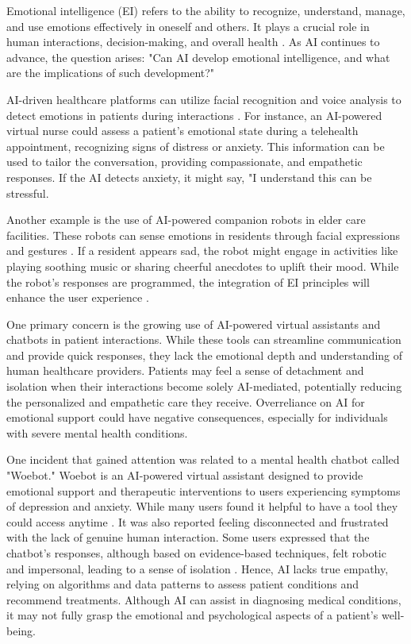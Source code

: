 \documentclass{article}
\begin{document}
Emotional intelligence (EI) refers to the ability to recognize, understand, manage, and use emotions effectively in oneself and others. It plays a crucial role in human interactions, decision-making, and overall health \cite{dixit2021equilibrating, beck2017rise}. As AI continues to advance, the question arises: "Can AI develop emotional intelligence, and what are the implications of such development?"

AI-driven healthcare platforms can utilize facial recognition and voice analysis to detect emotions in patients during interactions \cite{bohrmemar}. For instance, an AI-powered virtual nurse could assess a patient's emotional state during a telehealth appointment, recognizing signs of distress or anxiety. This information can be used to tailor the conversation, providing compassionate, and empathetic responses. If the AI detects anxiety, it might say, "I understand this can be stressful. 

Another example is the use of AI-powered companion robots in elder care facilities. These robots can sense emotions in residents through facial expressions and gestures \cite{lima2021robotic}. If a resident appears sad, the robot might engage in activities like playing soothing music or sharing cheerful anecdotes to uplift their mood. While the robot's responses are programmed, the integration of EI principles will enhance the user experience \cite{dautenhahn2007socially}.


One primary concern is the growing use of AI-powered virtual assistants and chatbots \cite{khadija2021ai} in patient interactions. While these tools can streamline communication and provide quick responses, they lack the emotional depth and understanding of human healthcare providers. Patients may feel a sense of detachment and isolation when their interactions become solely AI-mediated, potentially reducing the personalized and empathetic care they receive. Overreliance on AI for emotional support could have negative consequences, especially for individuals with severe mental health conditions. 

One incident that gained attention was related to a mental health chatbot called "Woebot." Woebot is an AI-powered virtual assistant designed to provide emotional support and therapeutic interventions to users experiencing symptoms of depression and anxiety. While many users found it helpful to have a tool they could access anytime \cite{fitzpatrick2017delivering}. It was also reported feeling disconnected and frustrated with the lack of genuine human interaction. Some users expressed that the chatbot's responses, although based on evidence-based techniques, felt robotic and impersonal, leading to a sense of isolation \cite{alm2022chatbot}. Hence, AI lacks true empathy, relying on algorithms and data patterns to assess patient conditions and recommend treatments. Although AI can assist in diagnosing medical conditions, it may not fully grasp the emotional and psychological aspects of a patient's well-being. 
\end{document}
